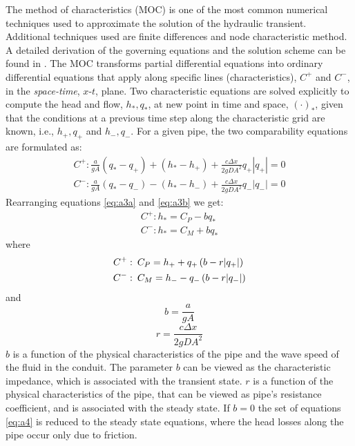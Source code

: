 \documentclass[twocolumn]{autart}
\begin{document}
The method of characteristics (MOC) is one of the most common numerical techniques used to approximate the solution of the hydraulic transient. Additional techniques used are finite differences and node characteristic method. A detailed derivation of the governing equations and the solution scheme can be found in \cite{Dal,wylie1993}. The MOC transforms partial differential equations into ordinary differential equations that apply along specific lines (characteristics), $C^+$ and $C^-$, in the \textit{space-time}, $x\text{-}t$, plane. Two characteristic equations are solved explicitly to compute the head and flow, $h_*, q_*$, at new point in time and space, $(\cdot)_*$, given that the conditions at a previous time step along the characteristic grid are known, i.e., $h_+, q_+$ and $h_-, q_-$. For a given pipe, the two comparability equations are formulated as:
\begin{subequations} \label{eq:a3}
\begin{align} 
		C^+: \frac{a}{gA}\left ( q_* - q_+\right) + \left ( h_* - h_+ \right ) + \frac{c\Delta x}								{2gDA^2}q_+|q_+| = 0 \label{eq:a3a} \\ 
		C^-: \frac{a}{gA}\left ( q_* - q_-\right) - \left ( h_* - h_- \right ) + \frac{c\Delta x}							{2gDA^2}q_-|q_-| = 0 \label{eq:a3b}
\end{align} 
\end{subequations}
Rearranging equations \eqref{eq:a3a} and \eqref{eq:a3b} we get:
\begin{subequations} \label{eq:a4}
\begin{align} 
		C^+: h_* = C_P - bq_* \label{eq:a4a} \\ 
		C^-: h_* = C_M + bq_*  \label{eq:a4b}
\end{align} 
\end{subequations}
where 
\begin{subequations}
\begin{align} 
		C^+: & \hspace{0.5em} C_P = h_+ + q_+ \left ( b - r |q_+| \right ) \\
		C^-:  &\hspace{0.5em} C_M = h_- - q_- \left ( b - r |q_-| \right ) 
\end{align} 
\end{subequations}
and 
\begin{equation}
b = \frac{a}{gA}
\end{equation}
\begin{equation}
r = \frac{c \Delta x}{2gDA^2}
\end{equation}
$b$ is a function of the physical characteristics of the pipe and the wave speed of the fluid in the conduit. The parameter $b$ can be viewed as the characteristic impedance, which is associated with the transient state. $r$ is a function of the physical characteristics of the pipe, that can be viewed as pipe's resistance coefficient, and is associated with the steady state. If $b=0$ the set of equations \eqref{eq:a4} is reduced to the steady state equations, where the head losses along the pipe occur only due to friction.
\end{document}
